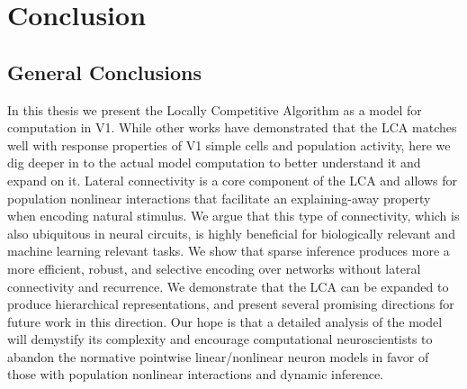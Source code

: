 \chapter{Conclusion}\label{ch:conclusion}

\section{General Conclusions}\label{sec:ch5_summary}
In this thesis we present the Locally Competitive Algorithm as a model for computation in V1.
While other works \parencite{zhu2013visual,olshausen1997sparse,vinje2000sparse} have demonstrated that the LCA matches well with response properties of V1 simple cells and population activity, here we dig deeper in to the actual model computation to better understand it and expand on it.
Lateral connectivity is a core component of the LCA and allows for population nonlinear interactions that facilitate an explaining-away property when encoding natural stimulus.
We argue that this type of connectivity, which is also ubiquitous in neural circuits, is highly beneficial for biologically relevant and machine learning relevant tasks.
We show that sparse inference produces more a more efficient, robust, and selective encoding over networks without lateral connectivity and recurrence.
We demonstrate that the LCA can be expanded to produce hierarchical representations, and present several promising directions for future work in this direction.
Our hope is that a detailed analysis of the model will demystify its complexity and encourage computational neuroscientists to abandon the normative pointwise linear/nonlinear neuron models in favor of those with population nonlinear interactions and dynamic inference.

